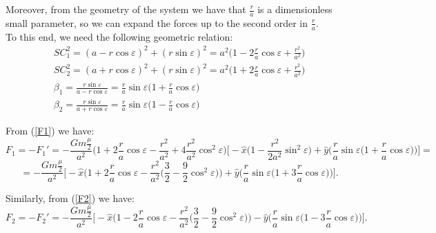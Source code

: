 \documentclass[11pt, oneside,reqno]{amsart}
\begin{document}
Moreover, from the geometry of the system we have that $\frac{r}{a}$ is a dimensionless small parameter, so we can expand the forces up to the second order in $\frac{r}{a}$.\\
To this end, we need the following geometric relation:
\begin{equation}
	\label{geometry}
	\begin{matrix} 
		SC_1^2=(a-r \cos \varepsilon)^2+(r \sin \varepsilon)^2 = a^2 \biggl( 1 - 2\frac{r}{a} \cos \varepsilon + \frac{r^2}{a^2} \biggr) \\
		SC_2^2=(a+r \cos \varepsilon)^2+(r \sin \varepsilon)^2 = a^2 \biggl( 1 + 2\frac{r}{a} \cos \varepsilon + \frac{r^2}{a^2} \biggr) \\
		\beta_1=\frac{r \sin \varepsilon}{a - r \cos \varepsilon} = \frac{r}{a} \sin \varepsilon \biggl( 1 + \frac{r}{a} \cos \varepsilon \biggr)\\ 
		\beta_2=\frac{r \sin \varepsilon}{a + r \cos \varepsilon} = \frac{r}{a} \sin \varepsilon \biggl( 1 - \frac{r}{a} \cos \varepsilon \biggr) 
	\end{matrix}
\end{equation}

From (\ref{F1}) we have:
\begin{equation*}
	F_1=-F_1'=-\frac{Gm\frac{\mu}{2}}{a^2} \biggl( 1 + 2\frac{r}{a} \cos \varepsilon - \frac{r^2}{a^2} + 4\frac{r^2}{a^2} \cos^2 \varepsilon \biggr) \biggl[-\hat{x} \biggl( 1 - \frac{r^2}{2a^2} \sin^2 \varepsilon \biggr) + \hat{y} \biggl( \frac{r}{a} \sin \varepsilon \biggl( 1 + \frac{r}{a} \cos \varepsilon \biggr) \biggr) \biggr]=
\end{equation*}
\begin{equation}
	\label{F1compute}
	=-\frac{Gm\frac{\mu}{2}}{a^2} \biggl[-\hat{x} \biggl( 1 + 2\frac{r}{a} \cos \varepsilon - \frac{r^2}{a^2}\biggl( \frac{3}{2} - \frac{9}{2} \cos^2 \varepsilon \biggr) \biggr) + \hat{y} \biggl(\frac{r}{a} \sin \varepsilon \biggl( 1 + 3\frac{r}{a} \cos \varepsilon \biggr) \biggr) \biggr].
\end{equation}

Similarly, from (\ref{F2}) we have:
\begin{equation}
	\label{F2compute}
	F_2=-F_2'=-\frac{Gm\frac{\mu}{2}}{a^2} \biggl[-\hat{x} \biggl( 1 - 2\frac{r}{a} \cos \varepsilon - \frac{r^2}{a^2}\biggl( \frac{3}{2} - \frac{9}{2} \cos^2 \varepsilon \biggr) \biggr) - \hat{y} \biggl(\frac{r}{a} \sin \varepsilon \biggl( 1 - 3\frac{r}{a} \cos \varepsilon \biggr) \biggr) \biggr].
\end{equation}
\end{document}
